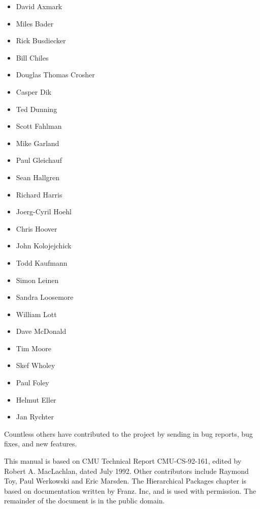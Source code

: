 \begin{itemize}
\item David Axmark
\item Miles Bader
\item Rick Busdiecker
\item Bill Chiles
\item Douglas Thomas Crosher
\item Casper Dik
\item Ted Dunning
\item Scott Fahlman
\item Mike Garland
\item Paul Gleichauf
\item Sean Hallgren
\item Richard Harris
\item Joerg-Cyril Hoehl
\item Chris Hoover
\item John Kolojejchick
\item Todd Kaufmann
\item Simon Leinen
\item Sandra Loosemore
\item William Lott
\item Dave McDonald
\item Tim Moore
\item Skef Wholey
\item Paul Foley
\item Helmut Eller
\item Jan Rychter
\end{itemize}

Countless others have contributed to the project by sending in bug
reports, bug fixes, and new features.

This manual is based on CMU Technical Report CMU-CS-92-161, edited by
Robert A. MacLachlan, dated July 1992. Other contributors include
Raymond Toy, Paul Werkowski and Eric Marsden. The Hierarchical
Packages chapter is based on documentation written by Franz. Inc, and
is used with permission. The remainder of the document is in the
public domain.
